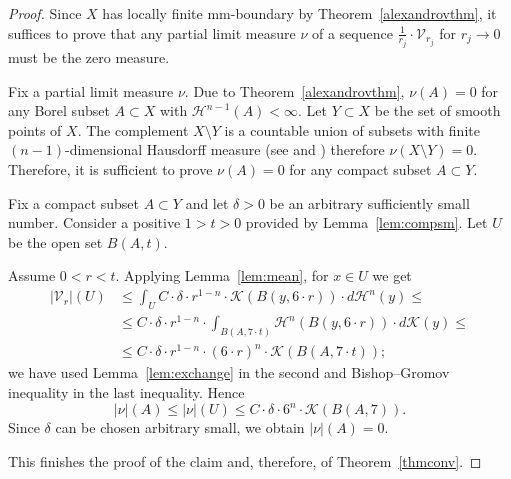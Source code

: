 \documentclass[12pt,leqno,intlimits]{amsart}
\numberwithin{equation}{section}
\theoremstyle{definition}
\theoremstyle{remark}
\newcommand{\tref}[1]{Theorem~\ref{#1}}
\newcommand{\lref}[1]{Lemma~\ref{#1}}
\begin{document}
\begin{proof}
Since $X$ has locally finite mm-boundary by
\tref{alexandrovthm}, it suffices to prove that any partial limit measure $\nu$ of a sequence $\frac 1 {r_j}\cdot \mathcal{V}_{r_j}$ for $r_j\to 0$ must be the zero measure.

Fix a partial limit measure $\nu$.
Due to \tref{alexandrovthm}, $\nu (A)=0$ for any Borel subset $A\subset X$ with $\mathcal H^{n-1} (A)<\infty$.
Let $Y\subset X$ be the set of smooth points of $X$.
The complement $X\setminus Y$ is a countable union of subsets with finite $(n-1)$-dimensional Hausdorff measure (see \cite{zajicek} and \cite[Theorem 1.4]{Schneider}) therefore $\nu (X\setminus Y) =0$. Therefore, it is sufficient to prove $\nu (A)=0$
for any compact subset $A\subset Y$.

Fix a compact subset $A\subset Y$ and 
let  $\delta>0$ be an arbitrary sufficiently small number. Consider a positive $1>t>0$ provided by \lref{lem:compsm}. Let $U$ be the open set  $B (A,t)$.

Assume $0<r<t$.
Applying \lref{lem:mean}, for $x\in U$ we get
\begin{align*}
|\mathcal{V}_r| (U)
&\leq \int _U C\cdot \delta \cdot r^{1-n}\cdot \mathcal K (B (y,{6{\cdot}r})) \cdot d\mathcal H^n (y) \leq
\\
&\leq C\cdot \delta \cdot r^{1-n} \cdot \int _{B (A,{7{\cdot}t})} \mathcal H^n (B (y,{6{\cdot}r})) \cdot d\mathcal K(y)
\leq
\\
&\leq C\cdot \delta \cdot r^{1-n} \cdot (6{\cdot}r) ^n \cdot \mathcal K(B (A,{7{\cdot}t}));
\end{align*}
we have used \lref{lem:exchange} in the second and Bishop--Gromov inequality in the last inequality. Hence
$$|\nu| (A) \leq |\nu| (U) \leq C\cdot \delta \cdot 6^n \cdot \mathcal K(B (A,7)). $$
Since $\delta$ can be chosen arbitrary small, we obtain $|\nu| (A)=0$.

This finishes the proof of the claim and, therefore, of \tref{thmconv}.
\end{proof}

\end{document}
